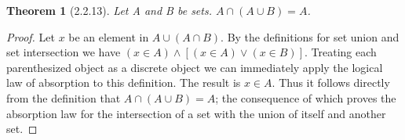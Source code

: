 \documentclass[a4paper, 12pt]{article}
\theoremstyle{plain}
\newtheorem*{theorem*}{Theorem}
\begin{document}
	
	\begin{theorem*}[2.2.13]
		Let A and B be sets. $A \cap (A \cup B) = A$.
	\end{theorem*}
	
	\begin{proof}
		Let $x$ be an element in $A \cup (A \cap B)$. By the definitions for set union and set intersection 
		we have $(x \in A) \land [(x \in A) \lor (x \in B)]$. Treating each parenthesized object as a 
		discrete object we can immediately apply the logical law of absorption to this definition. The 
		result is $x \in A$. Thus it follows directly from the definition that $A \cap (A \cup B) = A$; the 
		consequence of which proves the absorption law for the intersection of a set with the union of 
		itself and another set.
	\end{proof}
\end{document}
